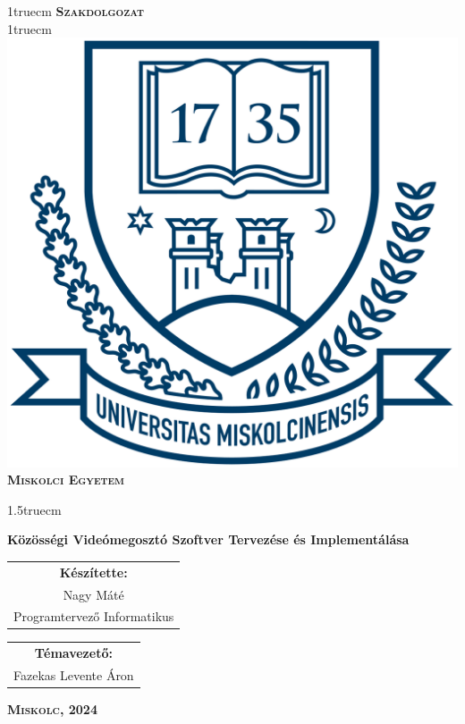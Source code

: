 \pagestyle{empty} %

{\large
    \begin{center}
        \vglue 1truecm
        \textbf{\huge\textsc{Szakdolgozat}}\\
        \vglue 1truecm
        \includegraphics[width=4.8truecm, height=4truecm]{images/me_logo.png}\\
        \textbf{\textsc{Miskolci Egyetem}}
    \end{center}}

\vglue 1.5truecm %

    {\LARGE
        \begin{center}
            \textbf{Közösségi Videómegosztó Szoftver Tervezése és Implementálása}
        \end{center}}

\vspace*{2.5truecm}
{\large
    \begin{center}
        \begin{tabular}{c}
            \textbf{Készítette:}   \\
            Nagy Máté \\
            Programtervez\H o Informatikus
        \end{tabular}
    \end{center}
    \begin{center}
        \begin{tabular}{c}
            \textbf{Témavezető:} \\
            Fazekas Levente \'Aron
        \end{tabular}
    \end{center}}
\vfill
{\large
    \begin{center}
        \textbf{\textsc{Miskolc, 2024}}
    \end{center}}

\newpage
